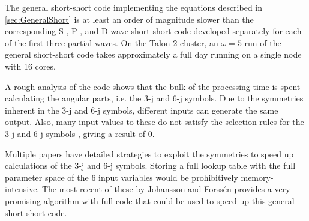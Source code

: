 \documentclass[Dissertation.tex]{subfiles}
\begin{document}
The general short-short code implementing the equations described in \cref{sec:GeneralShort}
is at least an order of magnitude slower than the corresponding S-, P-, and D-wave
short-short code developed separately for each of the first three partial waves.
On the Talon 2 \cite{Talon2} cluster, an $\omega = 5$ run of the general short-short code
takes approximately a full day running on a single node with 16 cores.

A rough analysis of the code shows that the bulk of the processing time is 
spent calculating the angular parts, i.e. the 3-j and 6-j symbols. Due to the 
symmetries inherent in the 3-j and 6-j symbols, different inputs can generate 
the same output. Also, many input values to these do not satisfy the 
selection rules for the 3-j and 6-j symbols
\cite[p.1054-1064]{Messiah1999} \cite{Edmonds1996}, giving a result of 0.

Multiple papers \cite{Luscombe1998,Wei1998,Rasch2004,Johansson2015} have
detailed strategies to exploit the symmetries to speed up calculations of the
3-j and 6-j symbols. Storing a full lookup table with the full parameter
space of the 6 input variables would be prohibitively memory-intensive.
The most recent of these by Johansson and Forss{\'{e}}n \cite{Johansson2015}
provides a very promising algorithm with full code that could be used to speed
up this general short-short code.



%
%





\biblio
\end{document}
